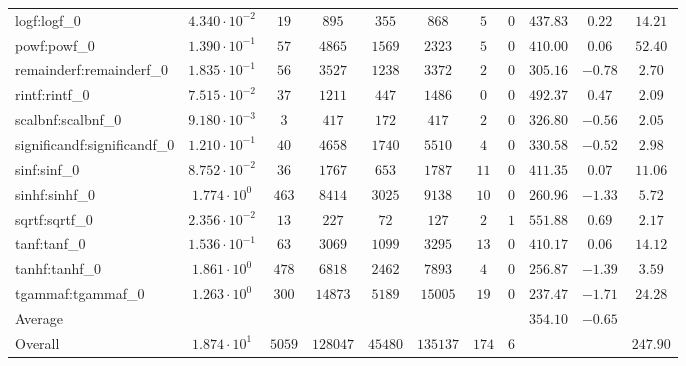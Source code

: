 \begin{tabular}{|l|c|c|c|c|c|c|c|c|c|c|}
logf:logf\_0                 & $ 4.340 \cdot 10^{-2} $ & $ 19     $ & $ 895    $ & $ 355   $ & $ 868    $ & $ 5   $ & $ 0 $ & $ 437.83      $ & $ 0.22    $ & $ 14.21   $ \\
powf:powf\_0                 & $ 1.390 \cdot 10^{-1} $ & $ 57     $ & $ 4865   $ & $ 1569  $ & $ 2323   $ & $ 5   $ & $ 0 $ & $ 410.00      $ & $ 0.06    $ & $ 52.40   $ \\
remainderf:remainderf\_0     & $ 1.835 \cdot 10^{-1} $ & $ 56     $ & $ 3527   $ & $ 1238  $ & $ 3372   $ & $ 2   $ & $ 0 $ & $ 305.16      $ & $ -0.78   $ & $ 2.70    $ \\
rintf:rintf\_0               & $ 7.515 \cdot 10^{-2} $ & $ 37     $ & $ 1211   $ & $ 447   $ & $ 1486   $ & $ 0   $ & $ 0 $ & $ 492.37      $ & $ 0.47    $ & $ 2.09    $ \\
scalbnf:scalbnf\_0           & $ 9.180 \cdot 10^{-3} $ & $ 3      $ & $ 417    $ & $ 172   $ & $ 417    $ & $ 2   $ & $ 0 $ & $ 326.80      $ & $ -0.56   $ & $ 2.05    $ \\
significandf:significandf\_0 & $ 1.210 \cdot 10^{-1} $ & $ 40     $ & $ 4658   $ & $ 1740  $ & $ 5510   $ & $ 4   $ & $ 0 $ & $ 330.58      $ & $ -0.52   $ & $ 2.98    $ \\
sinf:sinf\_0                 & $ 8.752 \cdot 10^{-2} $ & $ 36     $ & $ 1767   $ & $ 653   $ & $ 1787   $ & $ 11  $ & $ 0 $ & $ 411.35      $ & $ 0.07    $ & $ 11.06   $ \\
sinhf:sinhf\_0               & $ 1.774 \cdot 10^{0}  $ & $ 463    $ & $ 8414   $ & $ 3025  $ & $ 9138   $ & $ 10  $ & $ 0 $ & $ 260.96      $ & $ -1.33   $ & $ 5.72    $ \\
sqrtf:sqrtf\_0               & $ 2.356 \cdot 10^{-2} $ & $ 13     $ & $ 227    $ & $ 72    $ & $ 127    $ & $ 2   $ & $ 1 $ & $ 551.88      $ & $ 0.69    $ & $ 2.17    $ \\
tanf:tanf\_0                 & $ 1.536 \cdot 10^{-1} $ & $ 63     $ & $ 3069   $ & $ 1099  $ & $ 3295   $ & $ 13  $ & $ 0 $ & $ 410.17      $ & $ 0.06    $ & $ 14.12   $ \\
tanhf:tanhf\_0               & $ 1.861 \cdot 10^{0}  $ & $ 478    $ & $ 6818   $ & $ 2462  $ & $ 7893   $ & $ 4   $ & $ 0 $ & $ 256.87      $ & $ -1.39   $ & $ 3.59    $ \\
tgammaf:tgammaf\_0           & $ 1.263 \cdot 10^{0}  $ & $ 300    $ & $ 14873  $ & $ 5189  $ & $ 15005  $ & $ 19  $ & $ 0 $ & $ 237.47      $ & $ -1.71   $ & $ 24.28   $ \\
\hline
Average                      & $                     $ & $        $ & $        $ & $       $ & $        $ & $     $ & $   $ & $ 354.10      $ & $ -0.65   $ & $         $ \\
\hline
Overall                      & $ 1.874 \cdot 10^{1}  $ & $ 5059   $ & $ 128047 $ & $ 45480 $ & $ 135137 $ & $ 174 $ & $ 6 $ & $             $ & $         $ & $ 247.90  $ \\
\hline
\end{tabular}
